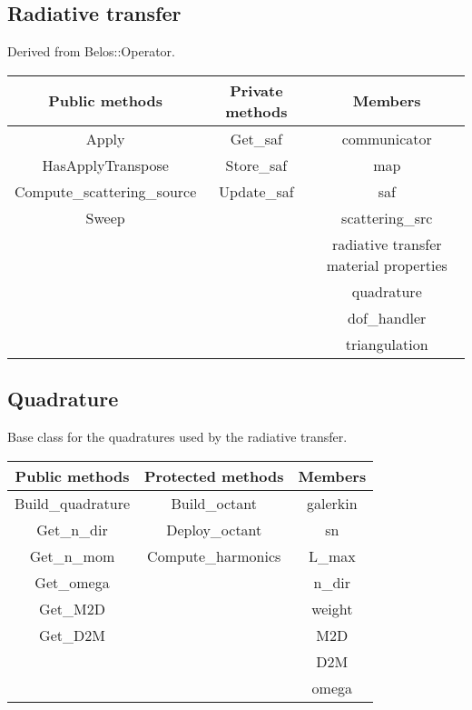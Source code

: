 \subsection{Radiative transfer}
Derived from Belos::Operator. 
\begin{table}[H]
  \centering
  \begin{tabular}{|c|c|c|}
    \hline
    Public methods & Private methods & Members \\
    \hline
    Apply                       & Get\_saf   & communicator \\
    HasApplyTranspose           & Store\_saf & map \\
    Compute\_scattering\_source & Update\_saf & saf \\
    Sweep                       & & scattering\_src \\
                                & & radiative transfer material properties \\
                                & & quadrature \\
                                & & dof\_handler \\
                                & & triangulation \\
    \hline
  \end{tabular}
\end{table}

\subsection{Quadrature}
Base class for the quadratures used by the radiative transfer.
\begin{table}[H]
  \centering
  \begin{tabular}{|c|c|c|}
    \hline
    Public methods & Protected methods & Members \\
    \hline
    Build\_quadrature & Build\_octant           & galerkin \\
          Get\_n\_dir & Deploy\_octant          & sn \\
          Get\_n\_mom & Compute\_harmonics & L\_max \\
           Get\_omega &                         & n\_dir \\
             Get\_M2D &                         & weight \\
             Get\_D2M &                         & M2D \\
                      &                         & D2M \\
                      &                         & omega \\
    \hline
  \end{tabular}
\end{table}


